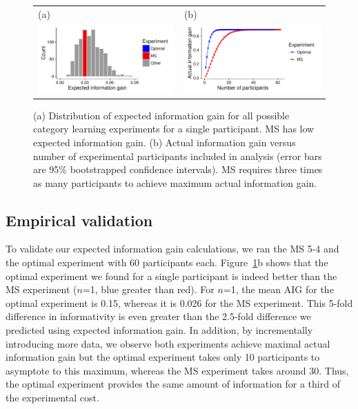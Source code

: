 \documentclass{article}
\begin{document}
\begin{figure}[t]
\centering
\begin{tabular}{l l}
(a) & (b)\\
\includegraphics[width=2.5in]{img/category-eig-dist.pdf} & \includegraphics[width=2.5in]{img/category-aig-curve.pdf}\\
\end{tabular}
\caption{(a) Distribution of expected information gain for all possible category learning experiments for a single participant. MS has low expected information gain. (b) Actual information gain versus number of experimental participants included in analysis (error bars are 95\% bootstrapped confidence intervals). MS requires three times as many participants to achieve maximum actual information gain.}
\label{fig:dist}
\end{figure}

\subsection{Empirical validation}

To validate our expected information gain calculations, we ran the MS 5-4 and the optimal experiment with 60 participants each.
Figure~\ref{fig:dist}b shows that the optimal experiment we found for a single participant is indeed better than the MS experiment ($n$=1, blue greater than red).
For $n$=1, the mean AIG for the optimal experiment is 0.15, whereas it is 0.026 for the MS experiment.
This 5-fold difference in informativity is even greater than the 2.5-fold difference we predicted using expected information gain.
In addition, by incrementally introducing more data, we observe both experiments achieve maximal actual information gain but the optimal experiment takes only 10 participants to asymptote to this maximum, whereas the MS experiment takes around 30.
Thus, the optimal experiment provides the same amount of information for a third of the experimental cost.
\end{document}
